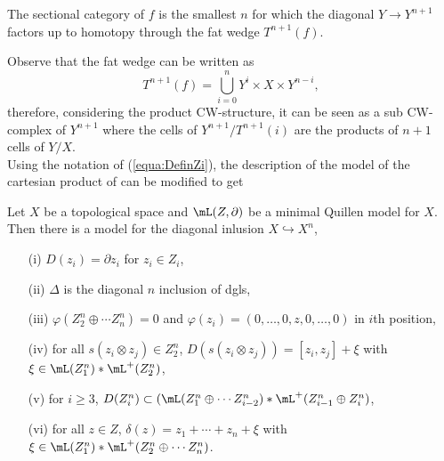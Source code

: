 \begin{proposition}\cite{Schwarz66}\label{prop:schwarz}
	The sectional category of $f$ is the smallest $n$ for which the diagonal $Y\to Y^{n+1}$ factors up to homotopy through the fat wedge $T^{n+1}(f)$.
\end{proposition}

Observe that the fat wedge can be written as \[T^{n+1}(f)=\bigcup_{i=0}^nY^i\times X\times Y^{n-i},\] therefore, considering the product CW-structure, it can be seen as a sub CW-complex of $Y^{n+1}$ where the cells of $Y^{n+1}/T^{n+1}(i)$ are the products of $n+1$ cells of $Y/X$.\\

Using the notation of (\ref{equa:DefinZi}), the description of the model of the cartesian product of \cite[VII.1.(2)]{Tanre} can be modified to get

\begin{proposition}\label{prop:mainModel}
	Let $X$ be a topological space and $\mL(Z,\partial)$ be a minimal Quillen model for $X$. Then there is a model for the diagonal inlusion $X\hookrightarrow X^n$,
	
	\begin{center}
	\end{center}
	
	\begin{itemize}
		\item [(i)] $D(z_i)=\partial z_i$ for $z_i\in Z_i$,
		\item [(ii)] $\Delta$ is the diagonal $n$ inclusion of dgls,
		\item [(iii)] $\varphi(Z^n_2\oplus\cdots Z^n_n)=0$ and $\varphi(z_i)=(0,\ldots,0,z,0,\ldots,0)$ in $i$th position,
		\item [(iv)] for all $s(z_i\otimes z_j)\in Z^n_2$, $D(s(z_i\otimes z_j))=[z_i,z_j]+\xi$ with $\xi\in \mL(Z^n_1)*\mL^+(Z^n_2)$,
		\item[(v)] for $i\ge 3$, $D(Z^n_i)\subset (\mL(Z^n_{1}\oplus \cdots Z^n_{i-2})*\mL^+(Z^n_{i-1}\oplus Z^n_{i})$,
		\item[(vi)] for all $z\in Z$, $\delta(z)=z_1+\cdots+z_n+\xi$ with $\xi\in \mL (Z^n_1)*\mL^+(Z^n_2\oplus\cdots Z^n_n)$.
	\end{itemize}
\end{proposition}

